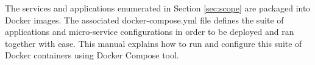 	The services and applications enumerated in Section \ref{sec:scope} are packaged into Docker images. The associated docker-compose.yml file defines the suite of applications and micro-service configurations in order to be deployed and ran together with ease. This manual explains how to run and configure this suite of Docker containers using Docker Compose tool.